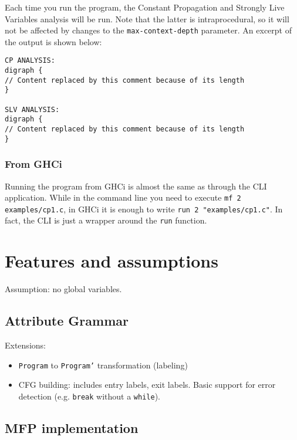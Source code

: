 \documentclass{article}
\begin{document}
Each time you run the program, the Constant Propagation and Strongly Live Variables analysis will be run. Note that the latter is intraprocedural, so it will not be affected by changes to the \texttt{max-context-depth} parameter. An excerpt of the output is shown below:

\begin{verbatim}
CP ANALYSIS:
digraph {
// Content replaced by this comment because of its length
}

SLV ANALYSIS:
digraph {
// Content replaced by this comment because of its length
}
\end{verbatim}

\subsubsection*{From GHCi}

Running the program from GHCi is almost the same as through the CLI application. While in the command line you need to execute \texttt{mf 2 examples/cp1.c}, in GHCi it is enough to write \texttt{run 2 "examples/cp1.c"}. In fact, the CLI is just a wrapper around the \texttt{run} function.

\section*{Features and assumptions}


Assumption: no global variables.

\subsection*{Attribute Grammar}

Extensions:

\begin{itemize}
	\item \texttt{Program} to \texttt{Program'} transformation (labeling)
	\item CFG building: includes entry labels, exit labels. Basic support for error detection (e.g. \texttt{break} without a \texttt{while}).
\end{itemize}

\subsection*{MFP implementation}
\end{document}
